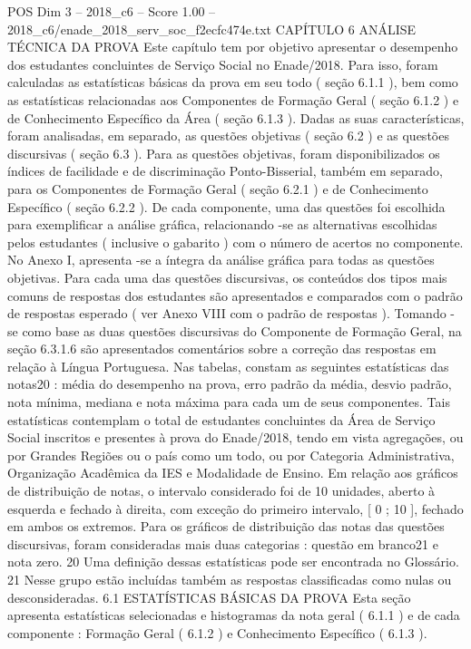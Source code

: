 \begin{textsample}{POS Dim 3 – 2018\_c6 – Score 1.00 – 2018\_c6/enade\_2018\_serv\_soc\_f2ecfc474e.txt}  \label{ex:f3_pos_118}
CAPÍTULO 6 ANÁLISE TÉCNICA DA PROVA Este capítulo tem por objetivo apresentar o desempenho dos estudantes concluintes de Serviço Social no Enade/2018.
Para isso, foram calculadas as estatísticas básicas da prova em seu todo ( seção 6.1.1 ), bem como as estatísticas relacionadas aos Componentes de Formação Geral ( seção 6.1.2 ) e de Conhecimento Específico da Área ( seção 6.1.3 ).
Dadas as suas características, foram analisadas, em separado, as questões objetivas ( seção 6.2 ) e as questões discursivas ( seção 6.3 ).
Para as questões objetivas, foram disponibilizados os índices de facilidade e de discriminação Ponto-Bisserial, também em separado, para os Componentes de Formação Geral ( seção 6.2.1 ) e de Conhecimento Específico ( seção 6.2.2 ).
De cada componente, uma das questões foi escolhida para exemplificar a análise gráfica, relacionando -se as alternativas escolhidas pelos estudantes ( inclusive o gabarito ) com o número de acertos no componente.
No Anexo I, apresenta -se a íntegra da análise gráfica para todas as questões objetivas.
Para cada uma das questões discursivas, os conteúdos dos tipos mais comuns de respostas dos estudantes são apresentados e comparados com o padrão de respostas esperado ( ver Anexo VIII com o padrão de respostas ).
Tomando -se como base as duas questões discursivas do Componente de Formação Geral, na seção 6.3.1.6 são apresentados comentários sobre a correção das respostas em relação à Língua Portuguesa.
Nas tabelas, constam as seguintes estatísticas das notas20 : média do desempenho na prova, erro padrão da média, desvio padrão, nota mínima, mediana e nota máxima para cada um de seus componentes.
Tais estatísticas contemplam o total de estudantes concluintes da Área de Serviço Social inscritos e presentes à prova do Enade/2018, tendo em vista agregações, ou por Grandes Regiões ou o país como um todo, ou por Categoria Administrativa, Organização Acadêmica da IES e Modalidade de Ensino.
Em relação aos gráficos de distribuição de notas, o intervalo considerado foi de 10 unidades, aberto à esquerda e fechado à direita, com exceção do primeiro intervalo, [ 0 ; 10 ], fechado em ambos os extremos.
Para os gráficos de distribuição das notas das questões discursivas, foram consideradas mais duas categorias : questão em branco21 e nota zero. 20 Uma definição dessas estatísticas pode ser encontrada no Glossário. 21 Nesse grupo estão incluídas também as respostas classificadas como nulas ou desconsideradas. 6.1 ESTATÍSTICAS BÁSICAS DA PROVA Esta seção apresenta estatísticas selecionadas e histogramas da nota geral ( 6.1.1 ) e de cada componente : Formação Geral ( 6.1.2 ) e Conhecimento Específico ( 6.1.3 ).

\end{textsample}
